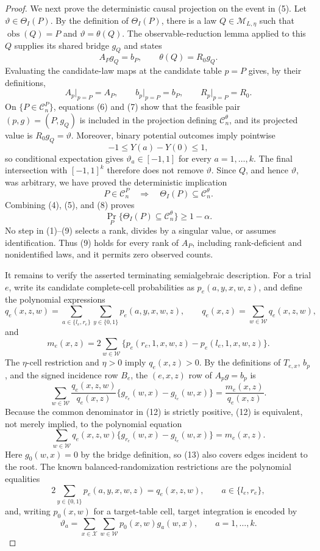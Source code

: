 \documentclass{article}
\begin{document}
\begin{proof}
We next prove the deterministic causal projection on the event in (5).  Let \(\vartheta\in\Theta_I(P)\).  By the definition of \(\Theta_I(P)\), there is a law \(Q\in\mathcal M_{L,\eta}\) such that \(\operatorname{obs}(Q)=P\) and \(\vartheta=\theta(Q)\).  The observable-reduction lemma applied to this \(Q\) supplies its shared bridge \(g_Q\) and states
\[
A_Pg_Q=b_P,
\qquad
\theta(Q)=R_0g_Q.
\tag{6}
\]
Evaluating the candidate-law maps at the candidate table \(p=P\) gives, by their definitions,
\[
A_p\big|_{p=P}=A_P,
\qquad
b_p\big|_{p=P}=b_P,
\qquad
R_p\big|_{p=P}=R_0.
\tag{7}
\]
On \(\{P\in\mathcal C_n^P\}\), equations (6) and (7) show that the feasible pair \((p,g)=(P,g_Q)\) is included in the projection defining \(\mathcal C_n^\theta\), and its projected value is \(R_0g_Q=\vartheta\).  Moreover, binary potential outcomes imply pointwise
\[
-1\leq Y(a)-Y(0)\leq 1,
\]
so conditional expectation gives \(\vartheta_a\in[-1,1]\) for every \(a=1,\ldots,k\).  The final intersection with \([-1,1]^k\) therefore does not remove \(\vartheta\).  Since \(Q\), and hence \(\vartheta\), was arbitrary, we have proved the deterministic implication
\[
P\in\mathcal C_n^P
\quad\Longrightarrow\quad
\Theta_I(P)\subseteq\mathcal C_n^\theta.
\tag{8}
\]
Combining (4), (5), and (8) proves
\[
\Pr_P\{\Theta_I(P)\subseteq\mathcal C_n^\theta\}
\geq 1-\alpha.
\tag{9}
\]
No step in (1)--(9) selects a rank, divides by a singular value, or assumes identification.  Thus (9) holds for every rank of \(A_P\), including rank-deficient and nonidentified laws, and it permits zero observed counts.

It remains to verify the asserted terminating semialgebraic description.  For a trial \(e\), write its candidate complete-cell probabilities as \(p_e(a,y,x,w,z)\), and define the polynomial expressions
\[
q_e(x,z,w)=\sum_{a\in\{l_e,r_e\}}\sum_{y\in\{0,1\}}
p_e(a,y,x,w,z),
\qquad
q_e(x,z)=\sum_{w\in\mathcal W}q_e(x,z,w),
\tag{10}
\]
and
\[
m_e(x,z)=2\sum_{w\in\mathcal W}
\{p_e(r_e,1,x,w,z)-p_e(l_e,1,x,w,z)\}.
\tag{11}
\]
The \(\eta\)-cell restriction and \(\eta>0\) imply \(q_e(x,z)>0\).  By the definitions of \(T_{e,x}\), \(b_p\), and the signed incidence row \(B_e\), the \((e,x,z)\) row of \(A_pg=b_p\) is
\[
\sum_{w\in\mathcal W}
\frac{q_e(x,z,w)}{q_e(x,z)}
\{g_{r_e}(w,x)-g_{l_e}(w,x)\}
=\frac{m_e(x,z)}{q_e(x,z)}.
\tag{12}
\]
Because the common denominator in (12) is strictly positive, (12) is equivalent, not merely implied, to the polynomial equation
\[
\sum_{w\in\mathcal W}q_e(x,z,w)
\{g_{r_e}(w,x)-g_{l_e}(w,x)\}
=m_e(x,z).
\tag{13}
\]
Here \(g_0(w,x)=0\) by the bridge definition, so (13) also covers edges incident to the root.  The known balanced-randomization restrictions are the polynomial equalities
\[
2\sum_{y\in\{0,1\}}p_e(a,y,x,w,z)=q_e(x,z,w),
\qquad a\in\{l_e,r_e\},
\tag{14}
\]
and, writing \(p_0(x,w)\) for a target-table cell, target integration is encoded by
\[
\vartheta_a=\sum_{x\in\mathcal X}\sum_{w\in\mathcal W}
p_0(x,w)g_a(w,x),
\qquad a=1,\ldots,k.
\tag{15}
\]


\end{proof}
\end{document}
